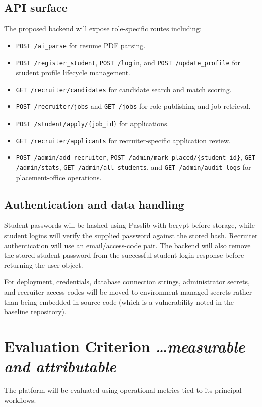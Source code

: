\documentclass[11pt,a4paper]{article}
\newcommand{\BvrHint}[1]{%
  {\normalfont\normalsize\itshape\hfill #1}}
\begin{document}
\subsection{API surface}
The proposed backend will expose role-specific routes including:
\begin{itemize}[leftmargin=0.7cm]
    \item \texttt{POST /ai\_parse} for resume PDF parsing.
    \item \texttt{POST /register\_student}, \texttt{POST /login}, and \texttt{POST /update\_profile} for student profile lifecycle management.
    \item \texttt{GET /recruiter/candidates} for candidate search and match scoring.
    \item \texttt{POST /recruiter/jobs} and \texttt{GET /jobs} for role publishing and job retrieval.
    \item \texttt{POST /student/apply/\{job\_id\}} for applications.
    \item \texttt{GET /recruiter/applicants} for recruiter-specific application review.
    \item \texttt{POST /admin/add\_recruiter}, \texttt{POST /admin/mark\_placed/\{student\_id\}}, \texttt{GET /admin/stats}, \texttt{GET /admin/all\_students}, and \texttt{GET /admin/audit\_logs} for placement-office operations.
\end{itemize}

\subsection{Authentication and data handling}
Student passwords will be hashed using Passlib with bcrypt before storage, while student logins will verify the supplied password against the stored hash. Recruiter authentication will use an email/access-code pair. The backend will also remove the stored student password from the successful student-login response before returning the user object. 

For deployment, credentials, database connection strings, administrator secrets, and recruiter access codes will be moved to environment-managed secrets rather than being embedded in source code (which is a vulnerability noted in the baseline repository).

\section{Evaluation Criterion\BvrHint{\ldots measurable and attributable}}
The platform will be evaluated using operational metrics tied to its principal workflows.
\end{document}
